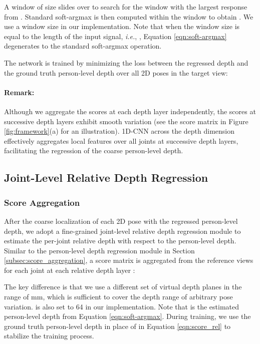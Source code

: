 \documentclass[final]{cvpr}
\begin{document}
A window of size  slides over  to search for the window with the largest response from .
Standard soft-argmax is then computed within the window to obtain .
We use a window size  in our implementation.
Note that when the window size is equal to the length of the input signal, \textit{i.e.}, , Equation \ref{eqn:soft-argmax} degenerates to the standard soft-argmax operation.

The network is trained by minimizing the  loss between the regressed depth  and the ground truth person-level depth  over all 2D poses  in the target view:


\vspace{-3mm} \paragraph{Remark:}
Although we aggregate the scores at each depth layer independently, the scores at successive depth layers exhibit smooth variation (see the score matrix in Figure \ref{fig:framework}(a) for an illustration).
1D-CNN across the depth dimension effectively aggregates local features over all  joints at successive depth layers, facilitating the regression of the coarse person-level depth.

\subsection{Joint-Level Relative Depth Regression}\label{subsec:joint-level}

\subsubsection{Score Aggregation}
After the coarse localization of each 2D pose with the regressed person-level depth,
we adopt a fine-grained joint-level relative depth regression module to estimate the per-joint relative depth with respect to the person-level depth.
Similar to the person-level depth regression module in Section \ref{subsec:score_aggregation}, a score matrix  is aggregated from the reference views for each joint  at each relative depth layer :

The key difference is that we use a different set of  virtual depth planes in the range of mm, which is sufficient to cover the depth range of arbitrary pose variation.  is also set to 64 in our implementation.
Note that  is the estimated person-level depth from Equation \ref{eqn:soft-argmax}.
During training, we use the ground truth person-level depth  in place of  in Equation \ref{eqn:score_rel} to stabilize the training process.
\end{document}

